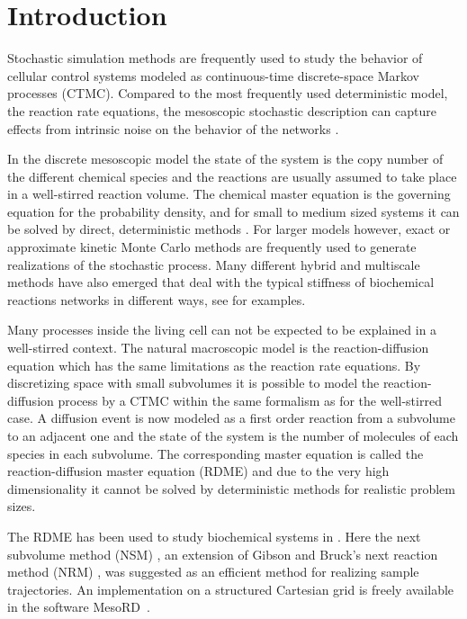 \section{Introduction}
\label{sec:intro}

Stochastic simulation methods are frequently used to study the
behavior of cellular control systems modeled as continuous-time
discrete-space Markov processes (CTMC). Compared to the most
frequently used deterministic model, the reaction rate equations, the
mesoscopic stochastic description can capture effects from intrinsic
noise on the behavior of the networks \cite{McAdams:1999fk,
BARKAILEIBLER, Elowitz:2002fj, THATTAI, Paulsson:2000kx}.

In the discrete mesoscopic model the state of the system is the copy
number of the different chemical species and the reactions are usually
assumed to take place in a well-stirred reaction volume. The chemical
master equation is the governing equation for the probability density,
and for small to medium sized systems it can be solved by direct,
deterministic methods \cite{PaulPhD, MacThesis, Ferm:fr, SPGRIDS1,
EngSpect1, EngSpect2}. For larger models however, exact or approximate
kinetic Monte Carlo methods \cite{SSA, TAULEAP} are frequently used to
generate realizations of the stochastic process. Many different hybrid
and multiscale methods have also emerged that deal with the typical
stiffness of biochemical reactions networks in different ways, see
\cite{MSSA, nSSA, MYHYB, Rao:2003df, haseltine:6959, minlic} for examples.

Many processes inside the living cell can not be expected to be
explained in a well-stirred context. The natural macroscopic model is
the reaction-diffusion equation which has the same limitations as the
reaction rate equations. By discretizing space with small subvolumes
it is possible to model the reaction-diffusion process by a CTMC
within the same formalism as for the well-stirred case. A diffusion
event is now modeled as a first order reaction from a subvolume to an
adjacent one and the state of the system is the number of molecules of
each species in each subvolume. The corresponding master equation is
called the reaction-diffusion master equation (RDME) and due to the
very high dimensionality it cannot be solved by deterministic methods
for realistic problem sizes.

The RDME has been used to study biochemical systems in \cite{BISTAB,
MinD}. Here the next subvolume method (NSM) \cite{BISTAB}, an
extension of Gibson and Bruck's next reaction method (NRM) \cite{NRM},
was suggested as an efficient method for realizing sample
trajectories. An implementation on a structured Cartesian grid is
freely available in the software MesoRD~\cite{mesoRD}.

